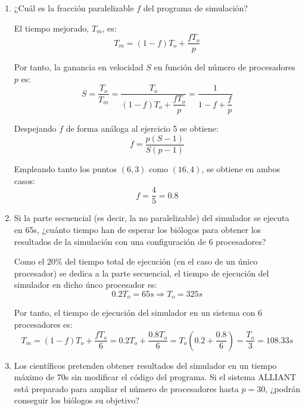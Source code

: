 \begin{enumerate}
    \item ¿Cuál es la fracción paralelizable $f$ del programa de simulación?
    
    El tiempo mejorado, $T_m$, es:
    \begin{equation*}
        T_m = (1-f)T_o + \dfrac{fT_o}{p}
    \end{equation*}

    Por tanto, la ganancia en velocidad $S$ en función del número de procesadores $p$ es:
    \begin{equation*}
        S = \dfrac{T_o}{T_m} = \dfrac{T_o}{(1-f)T_o + \dfrac{fT_o}{p}} = \dfrac{1}{1-f + \dfrac{f}{p}}
    \end{equation*}

    Despejando $f$ de forma análoga al ejercicio 5 se obtiene:
    \begin{equation*}
        f = \dfrac{p(S-1)}{S(p-1)}
    \end{equation*}

    Empleando tanto los puntos $(6,3)$ como $(16,4)$, se obtiene en ambos casos:
    \begin{equation*}
        f = \dfrac{4}{5} = 0.8
    \end{equation*}
    \item Si la parte secuencial (es decir, la no paralelizable) del simulador se ejecuta en 65s, ¿cuánto tiempo han de esperar los biólogos para obtener los resultados de la simulación con una configuración de 6 procesadores?
    
    Como el $20\%$ del tiempo total de ejecución (en el caso de un único procesador) se dedica a la parte secuencial, el tiempo de ejecución del simulador en dicho únco procesador es:
    \begin{equation*}
        0.2T_o = 65s\Longrightarrow T_o = 325s
    \end{equation*}

    Por tanto, el tiempo de ejecución del simulador en un sistema con 6 procesadores es:
    \begin{equation*}
        T_m = (1-f)T_o + \dfrac{fT_o}{6} = 0.2T_o + \dfrac{0.8T_o}{6} = T_o\left(0.2 + \dfrac{0.8}{6}\right) = \dfrac{T_o}{3} = 108.33s
    \end{equation*}
    \item Los científicos pretenden obtener resultados del simulador en un tiempo máximo de 70s sin modificar el código del programa. Si el sistema ALLIANT está preparado para ampliar el número de procesadores hasta $p = 30$, ¿podrán conseguir los biólogos su objetivo?
    

\end{enumerate}
